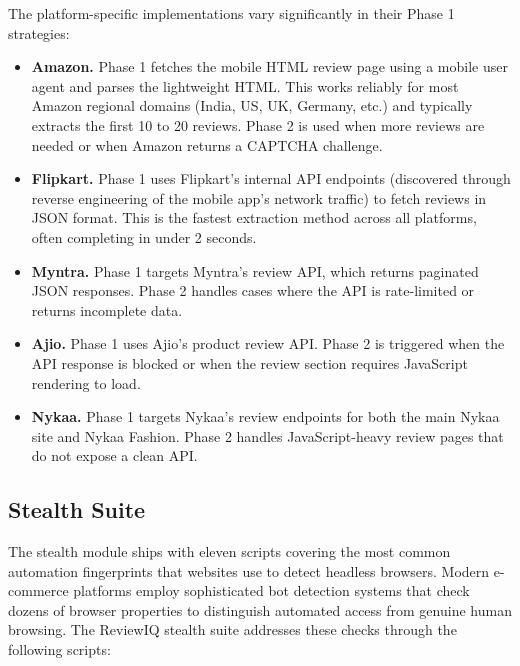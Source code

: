 \documentclass[12pt,a4paper,oneside]{report}
\begin{document}
The platform-specific implementations vary significantly in their
Phase 1 strategies:

\begin{itemize}[leftmargin=*]
  \item \textbf{Amazon.} Phase 1 fetches the mobile HTML review page
        using a mobile user agent and parses the lightweight HTML. This
        works reliably for most Amazon regional domains (India, US, UK,
        Germany, etc.) and typically extracts the first 10 to 20 reviews.
        Phase 2 is used when more reviews are needed or when Amazon
        returns a CAPTCHA challenge.
  \item \textbf{Flipkart.} Phase 1 uses Flipkart's internal API
        endpoints (discovered through reverse engineering of the mobile
        app's network traffic) to fetch reviews in JSON format. This is
        the fastest extraction method across all platforms, often
        completing in under 2 seconds.
  \item \textbf{Myntra.} Phase 1 targets Myntra's review API, which
        returns paginated JSON responses. Phase 2 handles cases where
        the API is rate-limited or returns incomplete data.
  \item \textbf{Ajio.} Phase 1 uses Ajio's product review API. Phase 2
        is triggered when the API response is blocked or when the review
        section requires JavaScript rendering to load.
  \item \textbf{Nykaa.} Phase 1 targets Nykaa's review endpoints for
        both the main Nykaa site and Nykaa Fashion. Phase 2 handles
        JavaScript-heavy review pages that do not expose a clean API.
\end{itemize}

\subsection{Stealth Suite}
The stealth module ships with eleven scripts covering the most common
automation fingerprints that websites use to detect headless browsers.
Modern e-commerce platforms employ sophisticated bot detection systems
that check dozens of browser properties to distinguish automated access
from genuine human browsing. The ReviewIQ stealth suite addresses these
checks through the following scripts:
\end{document}
